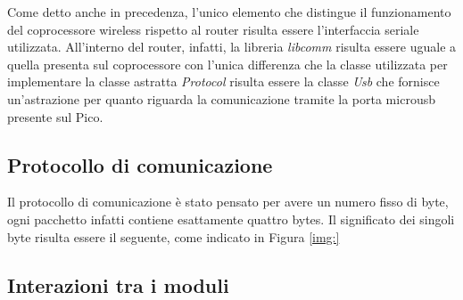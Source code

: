 \documentclass{article}
\begin{document}
	Come detto anche in precedenza, l'unico elemento che distingue il funzionamento del coprocessore wireless rispetto al router risulta essere l'interfaccia seriale utilizzata. All'interno del router, infatti, la libreria \textit{libcomm} risulta essere uguale a quella presenta sul coprocessore con l'unica differenza che la classe utilizzata per implementare la classe astratta \textit{Protocol} risulta essere la classe \textit{Usb} che fornisce un'astrazione per quanto riguarda la comunicazione tramite la porta microusb presente sul Pico.
	
	\subsection{Protocollo di comunicazione}
	Il protocollo di comunicazione \`e stato pensato per avere un numero fisso di byte, ogni pacchetto infatti contiene esattamente quattro bytes.
	Il significato dei singoli byte risulta essere il seguente, come indicato in Figura \ref{img:}
	
	\subsection{Interazioni tra i moduli}
	
\end{document}
